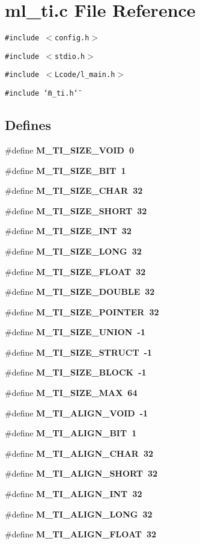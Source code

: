 \section{ml\_\-ti.c File Reference}
\label{ml__ti_8c}
{\tt \#include $<$config.h$>$}\par
{\tt \#include $<$stdio.h$>$}\par
{\tt \#include $<$Lcode/l\_\-main.h$>$}\par
{\tt \#include \char`\"{}m\_\-ti.h\char`\"{}}\par
\subsection*{Defines}
\begin{CompactItemize}
\item 
\#define \bf{M\_\-TI\_\-SIZE\_\-VOID}~0
\item 
\#define \bf{M\_\-TI\_\-SIZE\_\-BIT}~1
\item 
\#define \bf{M\_\-TI\_\-SIZE\_\-CHAR}~32
\item 
\#define \bf{M\_\-TI\_\-SIZE\_\-SHORT}~32
\item 
\#define \bf{M\_\-TI\_\-SIZE\_\-INT}~32
\item 
\#define \bf{M\_\-TI\_\-SIZE\_\-LONG}~32
\item 
\#define \bf{M\_\-TI\_\-SIZE\_\-FLOAT}~32
\item 
\#define \bf{M\_\-TI\_\-SIZE\_\-DOUBLE}~32
\item 
\#define \bf{M\_\-TI\_\-SIZE\_\-POINTER}~32
\item 
\#define \bf{M\_\-TI\_\-SIZE\_\-UNION}~-1
\item 
\#define \bf{M\_\-TI\_\-SIZE\_\-STRUCT}~-1
\item 
\#define \bf{M\_\-TI\_\-SIZE\_\-BLOCK}~-1
\item 
\#define \bf{M\_\-TI\_\-SIZE\_\-MAX}~64
\item 
\#define \bf{M\_\-TI\_\-ALIGN\_\-VOID}~-1
\item 
\#define \bf{M\_\-TI\_\-ALIGN\_\-BIT}~1
\item 
\#define \bf{M\_\-TI\_\-ALIGN\_\-CHAR}~32
\item 
\#define \bf{M\_\-TI\_\-ALIGN\_\-SHORT}~32
\item 
\#define \bf{M\_\-TI\_\-ALIGN\_\-INT}~32
\item 
\#define \bf{M\_\-TI\_\-ALIGN\_\-LONG}~32
\item 
\#define \bf{M\_\-TI\_\-ALIGN\_\-FLOAT}~32
\item 

\end{CompactItemize}

